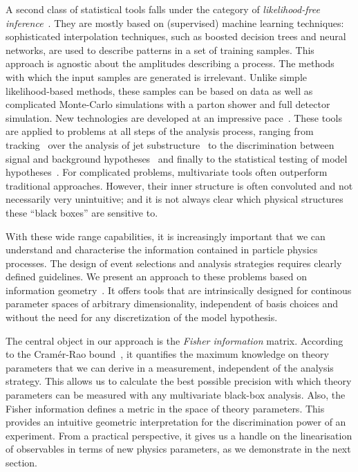 A second class of statistical tools falls under the category of
\emph{likelihood-free inference}~\cite{cranmer:nips2016}. They are
mostly based on (supervised) machine learning techniques:
sophisticated interpolation techniques, such as boosted decision trees
and neural networks, are used to describe patterns in a set of
training samples. This approach is agnostic about the amplitudes
describing a process. The methods with which the input samples are
generated is irrelevant. Unlike simple likelihood-based methods, these
samples can be based on data as well as complicated Monte-Carlo
simulations with a parton shower and full detector simulation. New
technologies are developed at an impressive
pace~\cite{Cranmer:2015bka, Louppe:2016ylz, Louppe:2016aov,
  Cranmer:2016lzt, Baldi:2016fzo}. These tools are applied to problems
at all steps of the analysis process, ranging from
tracking~\cite{Brehmer:ghost_probability} over the analysis of jet
substructure~\cite{Cogan:2014oua, Baldi:2014pta, deOliveira:2015xxd,
  Almeida:2015jua, Baldi:2016fql, Guest:2016iqz, Komiske:2016rsd,
  Kasieczka:2017nvn, Louppe:2017ipp} to the discrimination between
signal and background hypotheses~\cite{Baldi:2014kfa, Searcy:2015apa,
  Santos:2016kno, Alves:2016htj} and finally to the statistical
testing of model hypotheses~\cite{Buckley:2011kc, Bornhauser:2013aya,
  Bechtle:2017vyu}. For complicated problems, multivariate tools often
outperform traditional approaches. However, their inner structure is
often convoluted and not necessarily very unintuitive; and it is not
always clear which physical structures these ``black boxes'' are
sensitive to.

\newparagraph
%
With these wide range capabilities, it is increasingly important that
we can understand and characterise the information contained in
particle physics processes. The design of event selections and
analysis strategies requires clearly defined guidelines. We present an
approach to these problems based on information
geometry~\cite{efron1975, amari1982}. It offers tools that are
intrinsically designed for continous parameter spaces of arbitrary
dimensionality, independent of basis choices and without the need for
any discretization of the model hypothesis.

The central object in our approach is the \emph{Fisher information}
matrix. According to the Cram\'er-Rao bound~\cite{Rao:1945,
  Cramer:1946}, it quantifies the maximum knowledge on
theory parameters that we can derive in a measurement, independent of
the analysis strategy. This allows us to calculate the best possible
precision with which theory parameters can be measured with any
multivariate black-box analysis. Also, the Fisher information defines
a metric in the space of theory parameters. This provides an intuitive
geometric interpretation for the discrimination power of an
experiment. From a practical perspective, it gives us a handle on the
linearisation of observables in terms of new physics parameters, as we
demonstrate in the next section.


